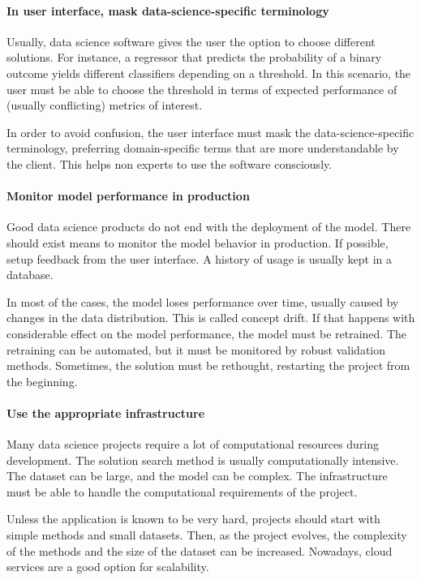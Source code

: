 \paragraph{In user interface, mask data-science-specific terminology}

Usually, data science software gives the user the option to choose different solutions.
For instance, a regressor that predicts the probability of a binary outcome yields
different classifiers depending on a threshold.  In this scenario, the user must be able
to choose the threshold in terms of expected performance of (usually conflicting) metrics
of interest.

In order to avoid confusion, the user interface must mask the data-science-specific
terminology, preferring domain-specific terms that are more understandable by the client.
This helps non experts to use the software consciously.

\paragraph{Monitor model performance in production}

Good data science products do not end with the deployment of the model.  There should
exist means to monitor the model behavior in production.  If possible, setup feedback from
the user interface.  A history of usage is usually kept in a database.

In most of the cases, the model loses performance over time, usually caused by changes in
the data distribution.  This is called concept drift.
If that happens with considerable effect on the model performance, the model must be
retrained.  The retraining can be automated, but it must be monitored by robust validation
methods. Sometimes, the solution must be rethought, restarting the project from the
beginning.

\paragraph{Use the appropriate infrastructure}

Many data science projects require a lot of computational resources during development.
The solution search method is usually computationally intensive.  The dataset can be
large, and the model can be complex.  The infrastructure must be able to handle the
computational requirements of the project.

Unless the application is known to be very hard, projects should start with simple methods
and small datasets.  Then, as the project evolves, the complexity of the methods and the
size of the dataset can be increased.  Nowadays, cloud services are a good option for
scalability.

